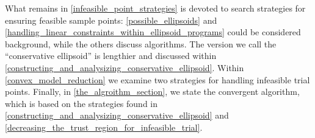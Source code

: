 


What remains in \cref{infeasible_point_strategies} is devoted to search strategies for ensuring feasible sample points:
\cref{possible_ellipsoids} and \cref{handling_linear_constraints_within_ellipsoid_programs} could be considered background, while the others discuss algorithms.
The version we call the ``conservative ellipsoid'' is lengthier and discussed within \cref{constructing_and_analysizing_conservative_ellipsoid}.
Within \cref{convex_model_reduction} we examine two strategies for handling infeasible trial points.
Finally, in \cref{the_algroithm_section}, we state the convergent algorithm, which is based on the strategies found in 
\cref{constructing_and_analysizing_conservative_ellipsoid} and \cref{decreasing_the_trust_region_for_infeasible_trial}.






% 
% 
% 
% 
% 
% 


